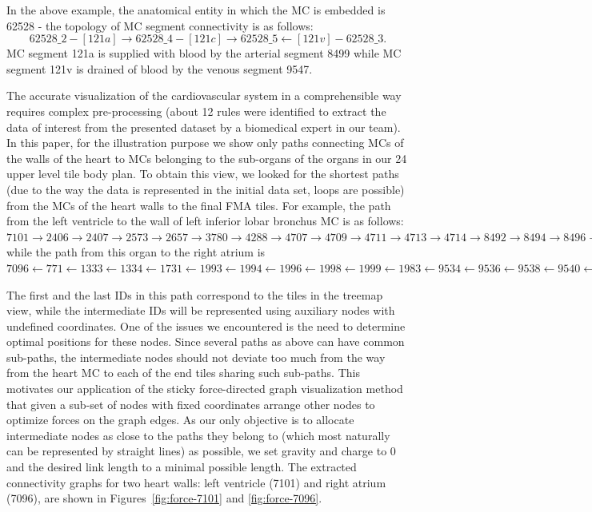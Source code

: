 In the above example, the anatomical entity in which the MC is embedded is 62528 - the topology of MC segment connectivity is as follows:
$$62528\_2 - [121a] \rightarrow 62528\_4 - [121c] \rightarrow 62528\_5 \leftarrow [121v] - 62528\_3.$$
MC segment 121a is supplied with blood by the arterial segment 8499 while MC segment 121v is drained of blood by the venous segment 9547.

The accurate visualization of the cardiovascular system in a comprehensible way requires complex pre-processing (about 12 rules were identified to extract the data of interest from the presented dataset by a biomedical expert in our team).
In this paper, for the illustration purpose we show only paths connecting MCs of the walls of the heart to MCs belonging to the sub-organs of the organs in our 24 upper level tile body plan.
To obtain this view, we looked for the shortest paths (due to the way the data is represented in the initial data set, loops are possible) from the MCs of the heart walls to the final FMA tiles. For example, the path from the left ventricle to the wall of left inferior lobar bronchus MC is as follows:
$7101 \rightarrow 2406 \rightarrow 2407 \rightarrow 2573 \rightarrow 2657 \rightarrow 3780 \rightarrow 4288 \rightarrow 4707 \rightarrow 4709 \rightarrow 4711 \rightarrow 4713 \rightarrow 4714 \rightarrow 8492 \rightarrow 8494 \rightarrow 8496 \rightarrow 8498 \rightarrow 8499 \rightarrow 62528,$
while the path from this organ to the right atrium is
$7096 \leftarrow 771 \leftarrow 1333 \leftarrow 1334 \leftarrow 1731 \leftarrow 1993 \leftarrow 1994 \leftarrow 1996 \leftarrow 1998 \leftarrow 1999 \leftarrow 1983 \leftarrow 9534 \leftarrow 9536 \leftarrow 9538 \leftarrow 9540 \leftarrow 9542 \leftarrow 9544 \leftarrow 9546 \leftarrow 9547 \leftarrow 62528.$

The first and the last IDs in this path correspond to the tiles in the treemap view, while the intermediate IDs will be represented using auxiliary nodes with undefined coordinates. One of the issues we encountered is the need to determine optimal positions for these nodes. Since several paths as above can have common sub-paths, the intermediate nodes should not deviate too much from the way from the heart MC to each of the end tiles sharing such sub-paths. This motivates our application of the sticky force-directed graph visualization method that given a sub-set of nodes with fixed coordinates arrange other nodes to optimize forces on the graph edges. As our only objective is to allocate intermediate nodes as close to the paths they belong to (which most naturally can be represented by straight lines) as possible, we set gravity and charge to 0 and the desired link length to a minimal possible length. The extracted connectivity graphs for two heart walls: left ventricle (7101) and right atrium (7096), are shown in Figures~\ref{fig:force-7101} and \ref{fig:force-7096}.

